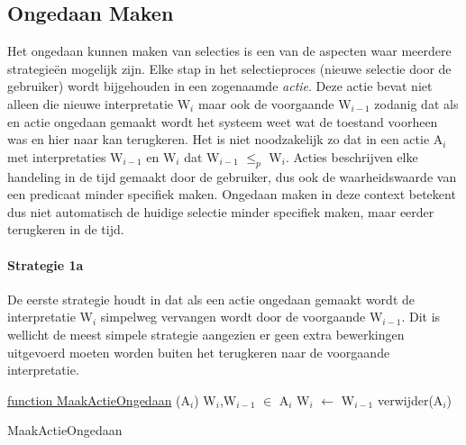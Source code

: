 \subsection{Ongedaan Maken}
Het ongedaan kunnen maken van selecties is een van de aspecten waar meerdere strategie\"{e}n mogelijk zijn. Elke stap in het selectieproces (nieuwe selectie door de gebruiker) wordt bijgehouden in een zogenaamde \textit{actie}. Deze actie bevat niet alleen die nieuwe interpretatie W$_{i}$ maar ook de voorgaande W$_{i-1}$ zodanig dat als en actie ongedaan gemaakt wordt het systeem weet wat de toestand voorheen was en hier naar kan terugkeren. Het is niet noodzakelijk zo dat in een actie A$_{i}$ met interpretaties W$_{i-1}$ en W$_{i}$ dat W$_{i-1}$ $\leq_{p}$ W$_{i}$. Acties beschrijven elke handeling in de tijd gemaakt door de gebruiker, dus ook de waarheidswaarde van een predicaat minder specifiek maken. Ongedaan maken in deze context betekent dus niet automatisch de huidige selectie minder specifiek maken, maar eerder terugkeren in de tijd.

\paragraph{Strategie 1a}
De eerste strategie houdt in dat als een actie ongedaan gemaakt wordt de interpretatie W$_{i}$ simpelweg vervangen wordt door de voorgaande W$_{i-1}$. Dit is wellicht de meest simpele strategie aangezien er geen extra bewerkingen uitgevoerd moeten worden buiten het terugkeren naar de voorgaande interpretatie.

\begin{algorithm}
	\underline{function MaakActieOngedaan} (A$_{i}$)\;
	{W$_{i}$,W$_{i-1}$} $\in$ A$_{i}$\;
	W$_{i}$ $\leftarrow$ W$_{i-1}$\;	
	verwijder(A$_{i}$)\;
	\caption{MaakActieOngedaan\label{alg:Strategie1a}}
\end{algorithm}

